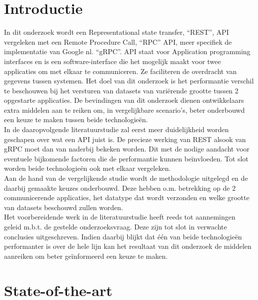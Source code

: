 
\section{Introductie}%
\label{sec:introductie}

In dit onderzoek wordt een Representational state transfer, ``REST'', API vergeleken met een Remote Procedure Call, ``RPC'' API, meer specifiek de
implementatie van Google nl. ``gRPC''. API staat voor Application programming interfaces en is een software-interface die het mogelijk maakt voor twee
applicaties om met elkaar te communiceren. Ze faciliteren de overdracht van gegevens tussen systemen. Het doel van dit onderzoek is het performantie verschil
te beschouwen bij het versturen van datasets van variërende grootte tussen 2 opgestarte applicaties. De bevindingen van dit onderzoek dienen ontwikkelaars
extra middelen aan te reiken om, in vergelijkbare scenario's, beter onderbouwd een keuze te maken tussen beide technologieën.\\

In de daaropvolgende literatuurstudie zal eerst meer duidelijkheid worden geschapen over wat een API juist is. De precieze werking van REST alsook van gRPC
moet dan van naderbij bekeken worden. Dit met de nodige aandacht voor eventuele bijkomende factoren die de performantie kunnen beïnvloeden.
Tot slot worden beide technologieën ook met elkaar vergeleken.\\

Aan de hand van de vergelijkende studie wordt de methodologie uitgelegd en de daarbij gemaakte keuzes onderbouwd. Deze hebben o.m. betrekking op de 2
communicerende applicaties, het datatype dat wordt verzonden en welke grootte van datasets beschouwd zullen worden.\\

Het voorbereidende werk in de literatuurstudie heeft reeds tot aannemingen geleid m.b.t. de gestelde onderzoeksvraag. Deze zijn tot slot in verwachte conclusies uitgeschreven.
Indien daarbij blijkt dat één van beide technologieën performanter is over de hele lijn kan het resultaat van dit onderzoek de middelen aanreiken om beter geïnformeerd een keuze te maken.\\



\section{State-of-the-art}%
\label{sec:state-of-the-art}

